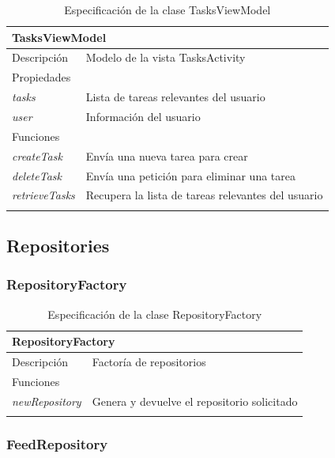 \vspace{-21pt}
\begin{longtable}{|p{} p{}|}
    \hline
    \multicolumn{2}{|l|}{TasksViewModel} \\ \hline \hline
    Descripción      & Modelo de la vista TasksActivity \\ \hline
    \multicolumn{2}{|l|}{Propiedades} \\
    \emph{tasks}  & Lista de tareas relevantes del usuario  \\
    \emph{user}  & Información del usuario  \\ \hline
    \multicolumn{2}{|l|}{Funciones} \\
    \emph{createTask}  & Envía una nueva tarea para crear \\
    \emph{deleteTask}  & Envía una petición para eliminar una tarea \\
    \emph{retrieveTasks}  & Recupera la lista de tareas relevantes del usuario \\ \hline
    \caption{Especificación de la clase TasksViewModel}
    \label{class:app:tasks_view_model}
\end{longtable}

\vspace{-36pt}
\subsection{Repositories}

\vspace{-11pt}
\subsubsection{RepositoryFactory}

\begin{longtable}{|p{} p{}|}
    \hline
    \multicolumn{2}{|l|}{RepositoryFactory} \\ \hline \hline
    Descripción      & Factoría de repositorios \\ \hline
    \multicolumn{2}{|l|}{Funciones} \\
    \emph{newRepository}  & Genera y devuelve el repositorio solicitado \\ \hline
    \caption{Especificación de la clase RepositoryFactory}
    \label{class:app:repository_factory}
\end{longtable}

\subsubsection{FeedRepository}

